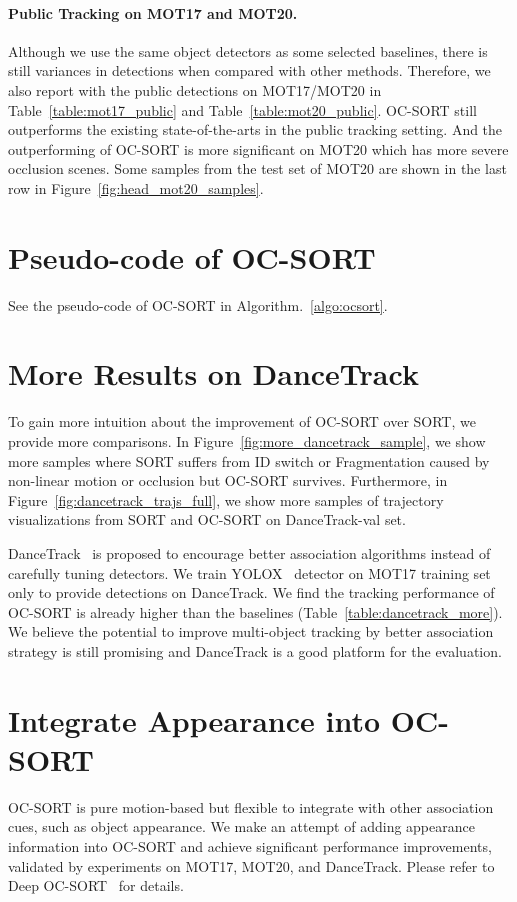 \documentclass[10pt,twocolumn,letterpaper]{article}
\begin{document}
\paragraph{Public Tracking on MOT17 and MOT20.} 
Although we use the same object detectors as some selected baselines, there is still variances in detections when compared with other methods. Therefore, we also report with the public detections on MOT17/MOT20 in  Table~\ref{table:mot17_public} and Table~\ref{table:mot20_public}. 
OC-SORT still outperforms the existing state-of-the-arts in the public tracking setting. 
And the outperforming of OC-SORT is more significant on MOT20 which has more severe occlusion scenes. Some samples from the test set of MOT20 are shown in the last row in Figure~\ref{fig:head_mot20_samples}.

\section{Pseudo-code of OC-SORT}
See the pseudo-code of OC-SORT in Algorithm.~\ref{algo:ocsort}.

\section{More Results on DanceTrack}
\label{sec:more_dance_results}
To gain more intuition about the improvement of OC-SORT over SORT, we provide more comparisons. In Figure~\ref{fig:more_dancetrack_sample}, we show more samples where SORT suffers from ID switch or Fragmentation caused by non-linear motion or occlusion but OC-SORT survives. Furthermore, in Figure~\ref{fig:dancetrack_trajs_full}, we show more samples of trajectory visualizations from SORT and OC-SORT on DanceTrack-val set.

DanceTrack~\cite{sun2021dancetrack} is proposed to encourage better association algorithms instead of carefully tuning detectors. We train YOLOX~\cite{ge2021yolox} detector on MOT17 training set only to provide detections on DanceTrack. We find the tracking performance of OC-SORT is already higher than the baselines (Table~\ref{table:dancetrack_more}). We believe the potential to improve multi-object tracking by better association strategy is still promising and DanceTrack is a good platform for the evaluation.

\section{Integrate Appearance into OC-SORT}
OC-SORT is pure motion-based but flexible to integrate with other association cues, such as object appearance. We make an attempt of adding appearance information into OC-SORT and achieve significant performance improvements, validated by experiments on MOT17, MOT20, and DanceTrack. Please refer to Deep OC-SORT~\cite{maggiolino2023deep} for details. 
\end{document}
